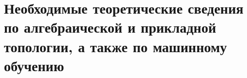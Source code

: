 \chapter{Необходимые теоретические сведения по алгебраической и прикладной топологии, а также по машинному обучению}





